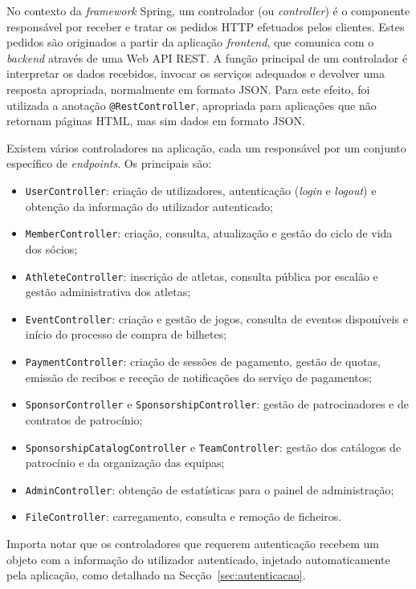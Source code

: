 No contexto da \textit{framework} Spring, um controlador (ou 
\textit{controller}) é o componente responsável por receber e tratar os 
pedidos HTTP efetuados pelos clientes. Estes pedidos são originados a partir da 
aplicação \textit{frontend}, que comunica com o \textit{backend} através de uma 
Web API REST. A função principal de um controlador é interpretar os dados 
recebidos, invocar os serviços adequados e devolver uma resposta apropriada, 
normalmente em formato JSON. Para este efeito, foi utilizada a anotação 
\texttt{@RestController}, apropriada para aplicações que não retornam páginas 
HTML, mas sim dados em formato JSON.

Existem vários controladores na aplicação, cada um responsável por um conjunto 
específico de \textit{endpoints}. Os principais são:

\begin{itemize}
    \item \texttt{UserController}: criação de utilizadores, autenticação 
    (\textit{login} e \textit{logout}) e obtenção da informação do utilizador 
    autenticado;
    \item \texttt{MemberController}: criação, consulta, atualização e gestão do 
    ciclo de vida dos sócios;
    \item \texttt{AthleteController}: inscrição de atletas, consulta pública 
    por escalão e gestão administrativa dos atletas;
    \item \texttt{EventController}: criação e gestão de jogos, consulta de 
    eventos disponíveis e início do processo de compra de bilhetes;
    \item \texttt{PaymentController}: criação de sessões de pagamento, gestão 
    de quotas, emissão de recibos e receção de notificações do serviço de 
    pagamentos;
    \item \texttt{SponsorController} e \texttt{SponsorshipController}: gestão de 
    patrocinadores e de contratos de patrocínio;
    \item \texttt{SponsorshipCatalogController} e \texttt{TeamController}: 
    gestão dos catálogos de patrocínio e da organização das equipas;
    \item \texttt{AdminController}: obtenção de estatísticas para o painel de 
    administração;
    \item \texttt{FileController}: carregamento, consulta e remoção de 
    ficheiros.
\end{itemize}

Importa notar que os controladores que requerem autenticação recebem um objeto 
com a informação do utilizador autenticado, injetado automaticamente pela 
aplicação, como detalhado na Secção~\ref{sec:autenticacao}.


